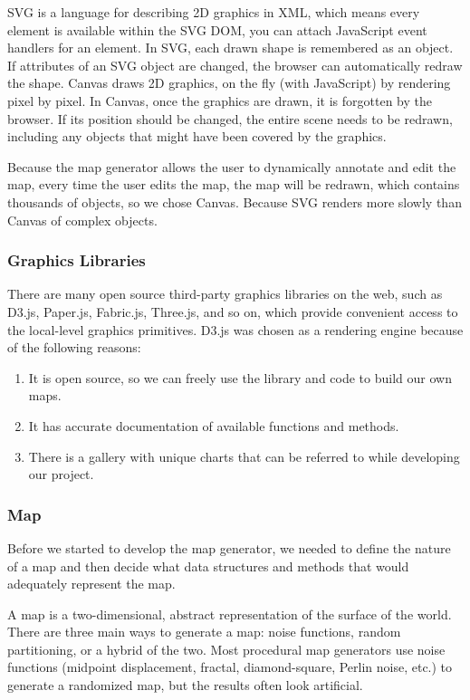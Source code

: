 SVG is a language for describing 2D graphics in XML, which means every element is available within the SVG DOM, you can attach JavaScript event handlers for an element. In SVG, each drawn shape is remembered as an object. If attributes of an SVG object are changed, the browser can automatically redraw the shape. Canvas draws 2D graphics, on the fly (with JavaScript) by rendering pixel by pixel. In Canvas, once the graphics are drawn, it is forgotten by the browser. If its position should be changed, the entire scene needs to be redrawn, including any objects that might have been covered by the graphics.

Because the map generator allows the user to dynamically annotate and edit the map, every time the user edits the map, the map will be redrawn, which contains thousands of objects, so we chose Canvas. Because SVG renders more slowly than Canvas of complex objects.

\subsubsection{Graphics Libraries}
\label{sec:Design>Map Generator Design>Graphics Libraries}
There are many open source third-party graphics libraries on the web, such as D3.js, Paper.js, Fabric.js, Three.js, and so on, which provide convenient access to the local-level graphics primitives. D3.js was chosen as a rendering engine because of the following reasons:
\begin{enumerate}
  \item It is open source, so we can freely use the library and code to build our own maps.
  \item It has accurate documentation of available functions and methods.
  \item There is a gallery with unique charts that can be referred to while developing our project.
\end{enumerate}

\subsubsection{Map}
\label{sec:Design>Map Generator Design>Map}
Before we started to develop the map generator, we needed to define the nature of a map and then decide what data structures and methods that would adequately represent the map.

A map is a two-dimensional, abstract representation of the surface of the world. There are three main ways to generate a map: noise functions, random partitioning, or a hybrid of the two. Most procedural map generators use noise functions (midpoint displacement, fractal, diamond-square, Perlin noise, etc.) to generate a randomized map, but the results often look artificial.

